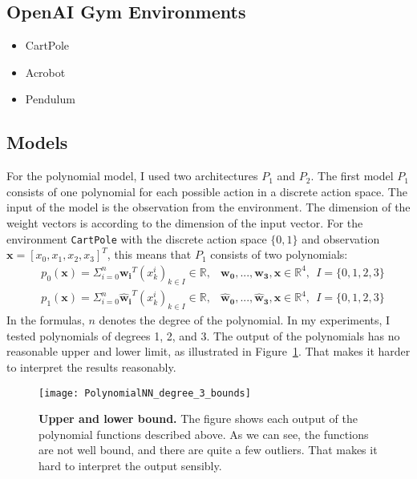 \subsection{OpenAI Gym Environments}
\begin{itemize}
  \item CartPole
  \item Acrobot
  \item Pendulum
\end{itemize}


\subsection{Models}
\label{ssec:models}
For the polynomial model, I used two architectures $P_1$ and $P_2$. The first model $P_1$ consists of one polynomial for each possible action in a discrete action space. The input of the model is the observation from the environment. The dimension of the weight vectors is according to the dimension of the input vector. For the environment \verb|CartPole| with the discrete action space $\{0, 1\}$ and observation $\mathbf{x} = [x_0, x_1, x_2, x_3]^T$, this means that $P_1$ consists of two polynomials:
\begin{align*}
  &p_0(\mathbf{x}) = \Sigma_{i=0}^{n} \mathbf{w_i}^T (x_k^i)_{k \in I} \in \mathbb{R}, &\mathbf{w_0}, ..., \mathbf{w_3}, \mathbf{x} \in \mathbb{R}^4, \ \ I = \{0, 1, 2, 3\} \\
  &p_1(\mathbf{x}) = \Sigma_{i=0}^{n} \mathbf{\hat{w}_i}^T (x_k^i)_{k \in I} \in \mathbb{R}, &\mathbf{\hat{w}_0}, ..., \mathbf{\hat{w}_3}, \mathbf{x} \in \mathbb{R}^4, \ \ I = \{0, 1, 2, 3\}
\end{align*}
In the formulas, $n$ denotes the degree of the polynomial. In my experiments, I tested polynomials of degrees 1, 2, and 3. The output of the polynomials has no reasonable upper and lower limit, as illustrated in Figure~\ref{fig:bounds}. That makes it harder to interpret the results reasonably.
\begin{figure}[ht]
\centering
\texttt{[image: PolynomialNN\_degree\_3\_bounds]}
\caption[Upper and lower bound]{
  \textbf{Upper and lower bound.}
  The figure shows each output of the polynomial functions described above. As we can see, the functions are not well bound, and there are quite a few outliers. That makes it hard to interpret the output sensibly.
}
\label{fig:bounds}
\end{figure}
